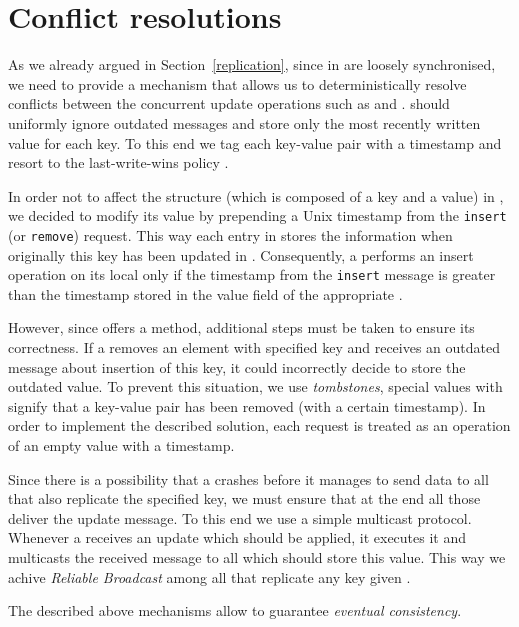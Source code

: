 \section{Conflict resolutions} \label{Conflicts}
    As we already argued in Section~\ref{replication}, since \Nodes in \DHTS are loosely synchronised, we need to provide a mechanism that allows us to deterministically resolve conflicts between the concurrent update operations such as \insertMethod and \removeMethod. \Nodes should uniformly ignore outdated messages and store only the most recently written value for each key. To this end we tag each key-value pair with a timestamp and resort to the last-write-wins policy \cite{Tho79}. 
    
    In order not to affect the \SegmentObject structure (which is composed of a key and a value) in \PHT, we decided to modify its value by prepending a Unix timestamp from the \texttt{insert} (or \texttt{remove}) request. This way each entry in \PHT stores the information when originally this key has been updated in \DHTS. Consequently, a \Node performs an insert operation on its local \PHT only if the timestamp from the \texttt{insert} message is greater than the timestamp stored in the value field of the appropriate \SegmentObject. 
    
    However, since \PHT offers a \removeMethod method, additional steps must be taken to ensure its correctness. If a \Node removes an element with specified key and receives an outdated message about insertion of this key, it could incorrectly decide to store the outdated value. To prevent this situation, we use \textit{tombstones}, special values with signify that a key-value pair has been removed (with a certain timestamp). In order to implement the described solution, each \removeMethod request is treated as an \insertMethod operation of an empty value with a timestamp. 
    
    Since there is a possibility that a \Node crashes before it manages to send data to all \Nodes that also replicate the specified key, we must ensure that at the end all those \Nodes deliver the update message. To this end we use a simple multicast protocol. Whenever a \Node receives an update which should be applied, it executes it and multicasts the received message to all \Nodes which should store this value. This way we achive \emph{Reliable Broadcast} among all \Nodes that replicate any key given \cite{GR06a}.
    
    The described above mechanisms allow \DHTS to guarantee \textit{eventual consistency}. 

